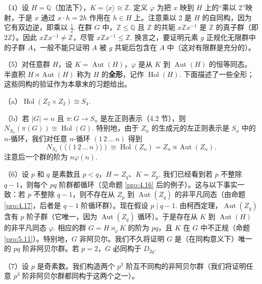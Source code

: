 \begin{example}
（4）设 \(H = \mathbb{Q}\)（加法下），\(K = \langle x \rangle \cong \mathbb{Z}\). 定义 \(\varphi\) 为把 \(x\) 映到 \(H\) 上的“乘以 2”映射，于是 \(x\) 通过 \(x \cdot h = 2h\) 作用在 \(h \in H\) 上。注意乘以 2 是 \(H\) 的自同构，因为它有双边逆，即乘以 \(\frac{1}{2}\). 在群 \(G\) 中，\(\mathbb{Z} \leq \mathbb{Q}\) 且 \(\mathbb{Z}\) 的共轭 \(x\mathbb{Z}x^{-1}\) 是 \(\mathbb{Z}\) 的真子群（即 \(2\mathbb{Z}\)）。因此 \(x\mathbb{Z}x^{-1} \neq \mathbb{Z}\)，尽管 \(x\mathbb{Z}x^{-1} \leq \mathbb{Z}\). 换言之，要证明元素 \(g\) 正规化无限群中的子群 \(A\)，一般不能只证明 \(A\) 被 \(g\) 共轭后包含在 \(A\) 中（这对有限群是充分的）。

（5）对任意群 \(H\)，设 \(K = \operatorname{Aut}(H)\)，\(\varphi\) 是从 \(K\) 到 \(\operatorname{Aut}(H)\) 的恒等同态。半直积 \(H \rtimes \operatorname{Aut}(H)\) 称为 \(H\) 的\textbf{全形}，记作 \(\operatorname{Hol}(H)\). 下面描述了一些全形；这些同构的验证作为本章末的习题给出。

（a）\(\operatorname{Hol}(Z_2 \times Z_2) \cong S_4\).

（b）若 \(|G| = n\) 且 \(\pi : G \to S_n\) 是左正则表示（4.2 节），则 \(N_{S_n}(\pi(G)) \cong \operatorname{Hol}(G)\). 特别地，由于 \(Z_n\) 的生成元的左正则表示是 \(S_n\) 中的 \(n\)-循环，我们对任意 \(n\)-循环 \((1\,2\,\ldots\,n)\) 得到
\[
N_{S_n}(\langle (1\,2\,\ldots\,n) \rangle) \cong \operatorname{Hol}(Z_n) = Z_n \rtimes \operatorname{Aut}(Z_n).
\]
注意后一个群的阶为 \(n\varphi(n)\).

（6）设 \(p\) 和 \(q\) 是素数且 \(p < q\)，\(H = Z_q\)、\(K = Z_p\). 我们已经看到若 \(p\) 不整除 \(q-1\)，则每个 \(pq\) 阶群都循环（见命题 \ref{pro:4.16} 后的例子）。这与以下事实一致：若 \(p\) 不整除 \(q-1\)，则不存在从 \(Z_p\) 到 \(\operatorname{Aut}(Z_q)\) 的非平凡同态（由命题 \ref{pro:4.17}，后者是 \(q-1\) 阶循环群）。现在假设 \(p \mid q-1\). 由柯西定理，\(\operatorname{Aut}(Z_q)\) 含有 \(p\) 阶子群（它唯一，因为 \(\operatorname{Aut}(Z_q)\) 循环）。于是存在从 \(K\) 到 \(\operatorname{Aut}(H)\) 的非平凡同态 \(\varphi\). 相应的群 \(G = H \rtimes_\varphi K\) 的阶为 \(pq\)，且 \(K\) 在 \(G\) 中不正规（命题 \ref{pro:5.11}）。特别地，\(G\) 非阿贝尔。我们不久将证明 \(G\) 是（在同构意义下）唯一的 \(pq\) 阶非阿贝尔群。若 \(p = 2\)，\(G\) 必同构于 \(D_{2q}\).

（7）设 \(p\) 是奇素数。我们构造两个 \(p^3\) 阶互不同构的非阿贝尔群（我们将证明任意 \(p^3\) 阶非阿贝尔群都同构于这两个之一）。


\end{example}
